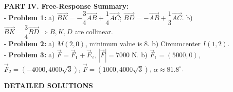 \documentclass[10pt,a4paper]{article}
\begin{document}
\vspace{5pt}
\noindent\textbf{PART IV. Free-Response Summary:}\\[2pt]
- \textbf{Problem 1:} a) $\vec{BK} = -\dfrac{3}{4}\vec{AB} + \dfrac{1}{4}\vec{AC}$; $\vec{BD} = -\vec{AB} + \dfrac{1}{3}\vec{AC}$. b) $\vec{BK} = \dfrac{3}{4}\vec{BD} \Rightarrow B, K, D$ are collinear.\\
- \textbf{Problem 2:} a) $M(2, 0)$, minimum value is $8$. b) Circumcenter $I(1, 2)$.\\
- \textbf{Problem 3:} a) $\vec{F} = \vec{F}_1 + \vec{F}_2$, $|\vec{F}| = 7000\text{ N}$. b) $\vec{F}_1 = (5000, 0)$, $\vec{F}_2 = (-4000, 4000\sqrt{3})$, $\vec{F} = (1000, 4000\sqrt{3})$, $\alpha \approx 81.8^\circ$.

\vspace{2pt}
\begin{center}
  {\large\bfseries\color{ink} DETAILED SOLUTIONS}
\end{center}
\vspace{0pt}
\end{document}
